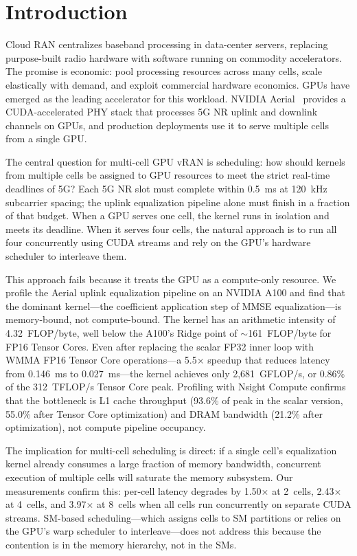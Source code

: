 \section{Introduction}
\label{sec:intro}

Cloud RAN centralizes baseband processing in data-center servers, replacing purpose-built radio hardware with software running on commodity accelerators. The promise is economic: pool processing resources across many cells, scale elastically with demand, and exploit commercial hardware economics. GPUs have emerged as the leading accelerator for this workload. NVIDIA Aerial~\cite{nvidia_aerial} provides a CUDA-accelerated PHY stack that processes 5G NR uplink and downlink channels on GPUs, and production deployments use it to serve multiple cells from a single GPU.

The central question for multi-cell GPU vRAN is scheduling: how should kernels from multiple cells be assigned to GPU resources to meet the strict real-time deadlines of 5G? Each 5G NR slot must complete within 0.5~ms at 120~kHz subcarrier spacing; the uplink equalization pipeline alone must finish in a fraction of that budget. When a GPU serves one cell, the kernel runs in isolation and meets its deadline. When it serves four cells, the natural approach is to run all four concurrently using CUDA streams and rely on the GPU's hardware scheduler to interleave them.

This approach fails because it treats the GPU as a compute-only resource. We profile the Aerial uplink equalization pipeline on an NVIDIA A100 and find that the dominant kernel---the coefficient application step of MMSE equalization---is memory-bound, not compute-bound. The kernel has an arithmetic intensity of 4.32~FLOP/byte, well below the A100's Ridge point of $\sim$161~FLOP/byte for FP16 Tensor Cores. Even after replacing the scalar FP32 inner loop with WMMA FP16 Tensor Core operations---a 5.5$\times$ speedup that reduces latency from 0.146~ms to 0.027~ms---the kernel achieves only 2,681~GFLOP/s, or 0.86\% of the 312~TFLOP/s Tensor Core peak. Profiling with Nsight Compute confirms that the bottleneck is L1 cache throughput (93.6\% of peak in the scalar version, 55.0\% after Tensor Core optimization) and DRAM bandwidth (21.2\% after optimization), not compute pipeline occupancy.

The implication for multi-cell scheduling is direct: if a single cell's equalization kernel already consumes a large fraction of memory bandwidth, concurrent execution of multiple cells will saturate the memory subsystem. Our measurements confirm this: per-cell latency degrades by 1.50$\times$ at 2~cells, 2.43$\times$ at 4~cells, and 3.97$\times$ at 8~cells when all cells run concurrently on separate CUDA streams. SM-based scheduling---which assigns cells to SM partitions or relies on the GPU's warp scheduler to interleave---does not address this because the contention is in the memory hierarchy, not in the SMs.

